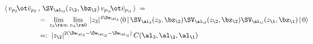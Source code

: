 \begin{equation}\begin{aligned}
\langle\,   v_{p_3}\!\ot  \bar{v}_{p_3}\,& ,\,\SV_{\al_\2}(z_\2,\bz_\2) \,
v_{p_\1}\!\ot \bar{v}_{p_\1}\, \rangle \;=\;\\
& =\;
\lim_{z_3\ra\infty}\lim_{z_\1\ra 0}\;|z_3|^{4\De_{\al_3}}
\langle 0\,|\,\SV_{\al_3}(z_3,\bz_\2)\SV_{\al_\2}(z_\2,\bz_\2)
\SV_{\al_\1}(z_\1,\bz_\1) \,|\,0
\rangle\\
& =:\;|z_\2|^{2(\De_{\al_3}-\De_{\al_\2}-\De_{\al_\1})}\,C(\al_3,\al_\2,\al_\1)
\end{aligned}\end{equation}

